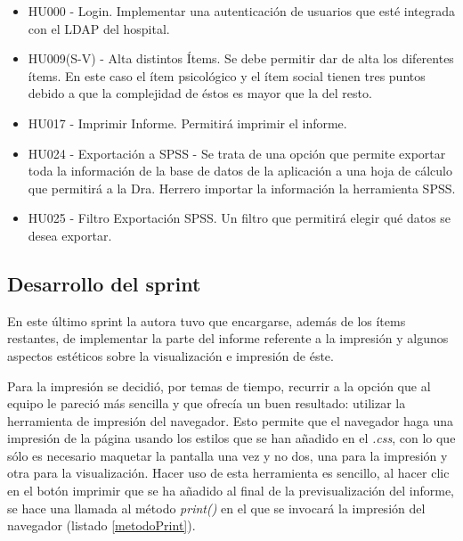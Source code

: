 \begin{itemize}
\item HU000 - Login. Implementar una autenticación de usuarios que esté integrada con el LDAP del hospital.
\item HU009(S-V) - Alta distintos Ítems. Se debe permitir dar de alta los diferentes ítems. En este caso el ítem psicológico y el ítem social tienen tres puntos debido a que la complejidad de éstos es mayor que la del resto.
\item HU017 - Imprimir Informe. Permitirá imprimir el informe.
\item HU024 - Exportación a SPSS - Se trata de una opción que permite exportar toda la información de la base de datos de la aplicación a una hoja de cálculo que permitirá a la Dra. Herrero importar la información la herramienta SPSS.
\item HU025 - Filtro Exportación SPSS. Un filtro que permitirá elegir qué datos se desea exportar.
\end{itemize}

\subsection{Desarrollo del sprint}
\label{subsec:S6-desarrollo}

En este último sprint la autora tuvo que encargarse, además de los ítems restantes, de implementar la parte del informe referente a la impresión y algunos aspectos estéticos sobre la visualización e impresión de éste.

Para la impresión se decidió, por temas de tiempo, recurrir a la opción que al equipo le pareció más sencilla y que ofrecía un buen resultado: utilizar la herramienta de impresión del navegador. Esto permite que el navegador haga una impresión de la página usando los estilos que se han añadido en el \emph{.css}, con lo que sólo es necesario maquetar la pantalla una vez y no dos, una para la impresión y otra para la visualización. Hacer uso de esta herramienta es sencillo, al hacer clic en el botón imprimir que se ha añadido al final de la previsualización del informe, se hace una llamada al método \emph{print()} en el que se invocará la impresión del navegador (listado \ref{metodoPrint}).
\clearpage 




